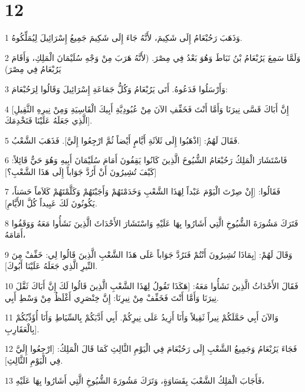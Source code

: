 \chapter{12}

\par 1 وَذَهَبَ رَحُبْعَامُ إِلَى شَكِيمَ، لأَنَّهُ جَاءَ إِلَى شَكِيمَ جَمِيعُ إِسْرَائِيلَ لِيُمَلِّكُوهُ.
\par 2 وَلَمَّا سَمِعَ يَرُبْعَامُ بْنُ نَبَاطَ وَهُوَ بَعْدُ فِي مِصْرَ. (لأَنَّهُ هَرَبَ مِنْ وَجْهِ سُلَيْمَانَ الْمَلِكِ، وَأَقَامَ يَرُبْعَامُ فِي مِصْرَ)
\par 3 وَأَرْسَلُوا فَدَعُوهُ. أَتَى يَرُبْعَامُ وَكُلُّ جَمَاعَةِ إِسْرَائِيلَ وَقَالُوا لِرَحُبْعَامَ:
\par 4 [إِنَّ أَبَاكَ قَسَّى نِيرَنَا وَأَمَّا أَنْتَ فَخَفِّفِ الآنَ مِنْ عُبُودِيَّةِ أَبِيكَ الْقَاسِيَةِ وَمِنْ نِيرِهِ الثَّقِيلِ الَّذِي جَعَلَهُ عَلَيْنَا فَنَخْدِمَكَ].
\par 5 فَقَالَ لَهُمُ: [اذْهَبُوا إِلَى ثَلاَثَةِ أَيَّامٍ أَيْضاً ثُمَّ ارْجِعُوا إِلَيَّ]. فَذَهَبَ الشَّعْبُ.
\par 6 فَاسْتَشَارَ الْمَلِكُ رَحُبْعَامُ الشُّيُوخَ الَّذِينَ كَانُوا يَقِفُونَ أَمَامَ سُلَيْمَانَ أَبِيهِ وَهُوَ حَيٌّ قَائِلاً: [كَيْفَ تُشِيرُونَ أَنْ أَرُدَّ جَوَاباً إِلَى هَذَا الشَّعْبِ؟]
\par 7 فَقَالُوا: [إِنْ صِرْتَ الْيَوْمَ عَبْداً لِهَذَا الشَّعْبِ وَخَدَمْتَهُمْ وَأَجَبْتَهُمْ وَكَلَّمْتَهُمْ كَلاَماً حَسَناً، يَكُونُونَ لَكَ عَبِيداً كُلَّ الأَيَّامِ].
\par 8 فَتَرَكَ مَشُورَةَ الشُّيُوخِ الَّتِي أَشَارُوا بِهَا عَلَيْهِ وَاسْتَشَارَ الأَحْدَاثَ الَّذِينَ نَشَأُوا مَعَهُ وَوَقَفُوا أَمَامَهُ،
\par 9 وَقَالَ لَهُمْ: [بِمَاذَا تُشِيرُونَ أَنْتُمْ فَنَرُدَّ جَوَاباً عَلَى هَذَا الشَّعْبِ الَّذِينَ قَالُوا لِي: خَفِّفْ مِنَ النِّيرِ الَّذِي جَعَلَهُ عَلَيْنَا أَبُوكَ].
\par 10 فَقَالَ الأَحْدَاثُ الَّذِينَ نَشَأُوا مَعَهُ: [هَكَذَا تَقُولُ لِهَذَا الشَّعْبِ الَّذِينَ قَالُوا لَكَ إِنَّ أَبَاكَ ثَقَّلَ نِيرَنَا وَأَمَّا أَنْتَ فَخَفِّفْ مِنْ نِيرِنَا: إِنَّ خِنْصَرِي أَغْلَظُ مِنْ وَسْطِ أَبِي.
\par 11 وَالآنَ أَبِي حَمَّلَكُمْ نِيراً ثَقِيلاً وَأَنَا أَزِيدُ عَلَى نِيرِكُمْ. أَبِي أَدَّبَكُمْ بِالسِّيَاطِ وَأَنَا أُؤَدِّبُكُمْ بِالْعَقَارِبِ].
\par 12 فَجَاءَ يَرُبْعَامُ وَجَمِيعُ الشَّعْبِ إِلَى رَحُبْعَامَ فِي الْيَوْمِ الثَّالِثِ كَمَا قَالَ الْمَلِكُ: [ارْجِعُوا إِلَيَّ فِي الْيَوْمِ الثَّالِثِ].
\par 13 فَأَجَابَ الْمَلِكُ الشَّعْبَ بِقَسَاوَةٍ، وَتَرَكَ مَشُورَةَ الشُّيُوخِ الَّتِي أَشَارُوا بِهَا عَلَيْهِ،
